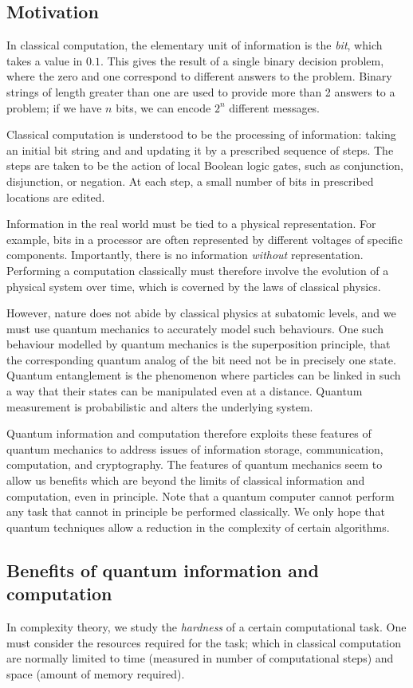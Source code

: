 \subsection{Motivation}
In classical computation, the elementary unit of information is the \emph{bit}, which takes a value in \( \qty{0,1} \).
This gives the result of a single binary decision problem, where the zero and one correspond to different answers to the problem.
Binary strings of length greater than one are used to provide more than 2 answers to a problem; if we have \( n \) bits, we can encode \( 2^n \) different messages.

Classical computation is understood to be the processing of information: taking an initial bit string and and updating it by a prescribed sequence of steps.
The steps are taken to be the action of local Boolean logic gates, such as conjunction, disjunction, or negation.
At each step, a small number of bits in prescribed locations are edited.

Information in the real world must be tied to a physical representation.
For example, bits in a processor are often represented by different voltages of specific components.
Importantly, there is no information \emph{without} representation.
Performing a computation classically must therefore involve the evolution of a physical system over time, which is coverned by the laws of classical physics.

However, nature does not abide by classical physics at subatomic levels, and we must use quantum mechanics to accurately model such behaviours.
One such behaviour modelled by quantum mechanics is the superposition principle, that the corresponding quantum analog of the bit need not be in precisely one state.
Quantum entanglement is the phenomenon where particles can be linked in such a way that their states can be manipulated even at a distance.
Quantum measurement is probabilistic and alters the underlying system.

Quantum information and computation therefore exploits these features of quantum mechanics to address issues of information storage, communication, computation, and cryptography.
The features of quantum mechanics seem to allow us benefits which are beyond the limits of classical information and computation, even in principle.
Note that a quantum computer cannot perform any task that cannot in principle be performed classically.
We only hope that quantum techniques allow a reduction in the complexity of certain algorithms.

\subsection{Benefits of quantum information and computation}
In complexity theory, we study the \emph{hardness} of a certain computational task.
One must consider the resources required for the task; which in classical computation are normally limited to time (measured in number of computational steps) and space (amount of memory required).

